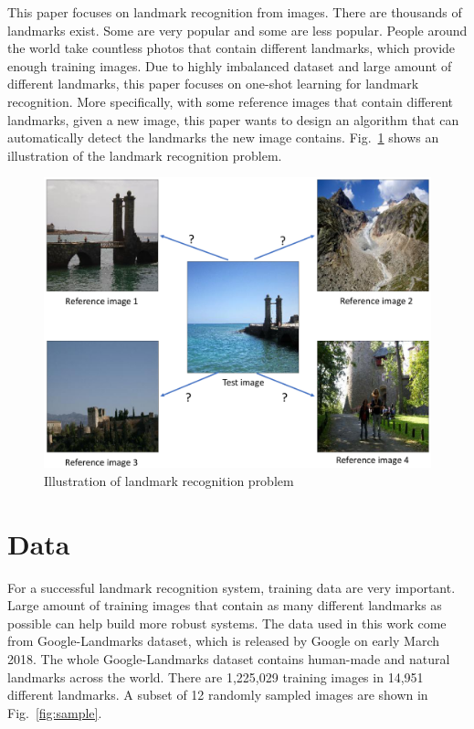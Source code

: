 \documentclass[final,3p]{elsarticle}
\begin{document}
This paper focuses on landmark recognition from images. There are thousands of landmarks exist. Some are very popular and some are less popular. People around the world take countless photos that contain different landmarks, which provide enough training images. Due to highly imbalanced dataset and large amount of different landmarks, this paper focuses on one-shot learning for landmark recognition. More specifically, with some reference images that contain different landmarks, given a new image, this paper wants to design an algorithm that can automatically detect the landmarks the new image contains. Fig.~\ref{fig:problem} shows an illustration of the landmark recognition problem.

\begin{figure}[hbtp]
\centering\includegraphics[width=0.8\linewidth]{./figures/problem.pdf}
\caption{Illustration of landmark recognition problem}
\label{fig:problem}
\end{figure}

\section{Data}
\label{S:data}

For a successful landmark recognition system, training data are very important. Large amount of training images that contain as many different landmarks as possible can help build more robust systems. The data used in this work come from Google-Landmarks dataset, which is released by Google on early March 2018. The whole Google-Landmarks dataset contains human-made and natural landmarks across the world. There are 1,225,029 training images in 14,951 different landmarks. A subset of 12 randomly sampled images are shown in Fig.~\ref{fig:sample}.
\end{document}
